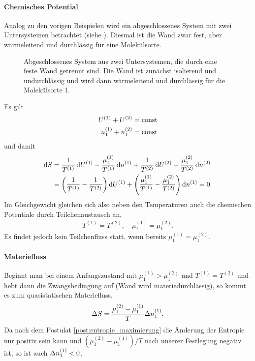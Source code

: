 \paragraph*{Chemisches Potential}

Analog zu den vorigen Beispielen wird ein abgeschlossenes System mit zwei Untersystemen betrachtet (siehe ). Diesmal ist die Wand zwar fest, aber wärmeleitend und durchlässig für eine Molekülsorte.

\begin{figure}[htbp]
    \centering
    \tfigDoppelsystemUVNbeweglicheIsolierendeWand
    \caption{Abgeschlossenes System aus zwei Untersystemen, die durch eine feste Wand getrennt sind. Die Wand ist zunächst isolierend und undurchlässig und wird dann wärmeleitend und durchlässig für die Molekülsorte 1.}
    \label{fig:DoppelsystemUVNbeweglicheIsolierendeWand}
\end{figure}

Es gilt
\begin{align*}
    U^{(1)} + U^{(2)}         & = \mathrm{const} \\
    n_1^{(1)} + n_1^{(2)} & = \mathrm{const}
\end{align*}
und damit
\begin{align*}
    \mathop{}\!\mathrm{d} S & = \frac{1}{T^{(1)}}\mathop{}\!\mathrm{d} U^{(1)} - \frac{\mu_1^{(1)}}{T^{(1)}}\mathop{}\!\mathrm{d} n^{(1)}+\frac{1}{T^{(2)}}\mathop{}\!\mathrm{d} U^{(2)} - \frac{\mu_1^{(2)}}{T^{(2)}}\mathop{}\!\mathrm{d} n^{(2)}   \\
            & = \left(\frac{1}{T^{(1)}}-\frac{1}{T^{(2)}}\right)\mathop{}\!\mathrm{d} U^{(1)} + \left(\frac{\mu_1^{(1)}}{T^{(1)}}-\frac{\mu_1^{(2)}}{T^{(2)}}\right) \mathop{}\!\mathrm{d} n^{(1)} = 0.
\end{align*}
Im Gleichgewicht gleichen sich also neben den Temperaturen auch die chemischen Potentiale durch Teilchenaustausch an,
\begin{align*}
    T^{(1)} = T^{(2)}, \quad \mu_1^{(1)} = \mu_1^{(2)}.
\end{align*}
Es findet jedoch kein Teilchenfluss statt, wenn bereits $\mu_1^{(1)} = \mu_1^{(2)}$.

\paragraph*{Materiefluss}

Beginnt man bei einem Anfangszustand mit $\mu_1^{(1)} > \mu_1^{(2)}$ und $T^{(1)} = T^{(2)}$ und hebt dann die Zwangsbedingung auf (Wand wird materiedurchlässig), so kommt es zum quasistatischen Materiefluss,
\begin{align*}
    \Delta S = \frac{\mu_1^{(2)} - \mu_1^{(1)}}{T} \Delta n_1^{(1)}.
\end{align*}
Da nach dem Postulat \ref{post:entropie_maximierung} die Änderung der Entropie nur positiv sein kann und $(\mu_1^{(2)} - \mu_1^{(1)})/T$ nach unserer Festlegung negativ ist, so ist auch $\Delta n_1^{(1)}<0$.

